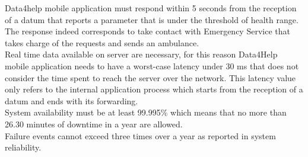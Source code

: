Data4help mobile application must respond within 5 seconds from the reception of a datum that reports a parameter that is under the threshold of health range. The response indeed corresponds to take contact with Emergency Service that takes charge of the requests and sends an ambulance. \\
Real time data available on server are necessary, for this reason Data4Help mobile application needs to have a worst-case latency under 30 ms that does not consider the time spent to reach the server over the network. This latency value only refers to the internal application process which starts from the reception of a datum and ends with its forwarding.  \\ 
System availability must be at least 99.995\% which means that no more than 26.30 minutes of downtime in a year are allowed.  \\
Failure events cannot exceed three times over a year as reported in system reliability. 
